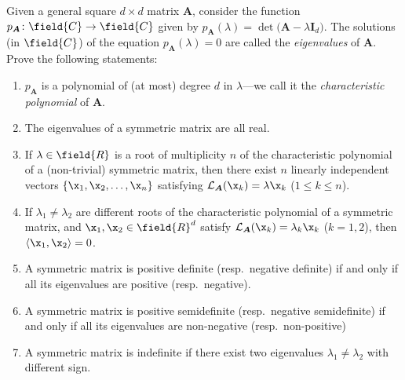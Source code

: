 \begin{problem}[Eigenvalues]\label{problem:eigenvalues}
Given a general square $d \times d$ matrix $\boldsymbol{A}$, consider the function $p_{\boldsymbol{A}} \colon \field{C} \to \field{C}$ given by $p_{\boldsymbol{A}}(\lambda) = \det\big(\boldsymbol{A} - \lambda \boldsymbol{I}_d \big)$.  The solutions (in $\field{C}$) of the equation $p_{\boldsymbol{A}}(\lambda)=0$ are called the \emph{eigenvalues} of $\boldsymbol{A}$.  Prove the following statements:
\begin{enumerate}
	\item $p_{\boldsymbol{A}}$ is a polynomial of (at most) degree $d$ in $\lambda$---we call it the \emph{characteristic polynomial} of $\boldsymbol{A}$.
	\item The eigenvalues of a symmetric matrix are all real.
	\item If $\lambda \in \field{R}$ is a root  of multiplicity $n$ of the characteristic polynomial of a (non-trivial) symmetric matrix, then there exist $n$ linearly independent vectors $\{ \x_1, \x_2, \dotsc, \x_n \}$ satisfying $\mathcal{L}_{\boldsymbol{A}} (\x_k) = \lambda \x_k$ ($1\leq k \leq n$).
	\item If $\lambda_1 \neq \lambda_2$ are different roots of the characteristic polynomial of a symmetric matrix, and $\x_1, \x_2 \in \field{R}^d$ satisfy $\mathcal{L}_{\boldsymbol{A}}(\x_k) = \lambda_k \x_k$ ($k=1,2$), then $\langle \x_1, \x_2 \rangle = 0$.
	\item A symmetric matrix is positive definite (resp.~negative definite) if and only if all its eigenvalues are positive (resp.~negative).
	\item A symmetric matrix is positive semidefinite (resp.~negative semidefinite) if and only if all its eigenvalues are non-negative (resp.~non-positive)
	\item A symmetric matrix is indefinite if there exist two eigenvalues $\lambda_1 \neq \lambda_2$ with different sign.
\end{enumerate}
\end{problem}


